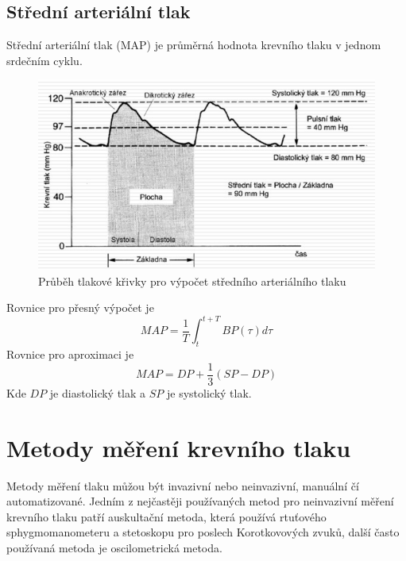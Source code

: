 \subsection{Střední arteriální tlak}
Střední arteriální tlak (MAP) je průměrná hodnota krevního tlaku v jednom srdečním cyklu.
\begin{figure}[H]
    \caption{Průběh tlakové křivky pro výpočet středního arteriálního tlaku \cite{cite:4}}
    \includegraphics[width=1\textwidth]{pictures/map.jpg}
\end{figure}
Rovnice pro přesný výpočet je
\begin{equation}
    MAP = \frac{1}{T} \int_{t}^{t + T} BP(\tau) d\tau
\end{equation}
Rovnice pro aproximaci je
\begin{equation}
    MAP = DP + \frac{1}{3}(SP - DP)
\end{equation}
Kde $DP$ je diastolický tlak a $SP$ je systolický tlak.
\section{Metody měření krevního tlaku}
Metody měření tlaku můžou být invazivní nebo neinvazivní, manuální čí automatizované. Jedním z nejčastěji používaných metod pro neinvazivní měření
krevního tlaku patří auskultační metoda, která používá rtuťového sphygmomanometeru a stetoskopu pro poslech Korotkovových zvuků, další často používaná metoda je oscilometrická metoda.
\cite{cite:Fabian}
